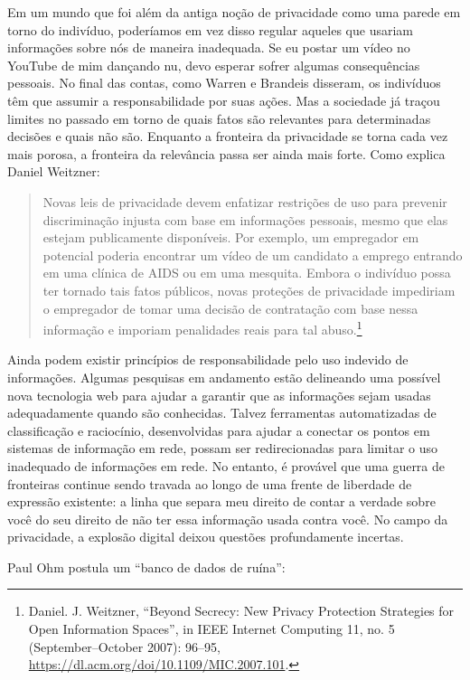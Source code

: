 \documentclass{book}
\begin{document}
Em um mundo que foi além da antiga noção de privacidade como uma parede em torno
do indivíduo, poderíamos em vez disso regular aqueles que usariam informações
sobre nós de maneira inadequada. Se eu postar um vídeo no YouTube de mim dançando
nu, devo esperar sofrer algumas consequências pessoais. No final das contas, como
Warren e Brandeis disseram, os indivíduos têm que assumir a responsabilidade por
suas ações. Mas a sociedade já traçou limites no passado em torno de quais fatos
são relevantes para determinadas decisões e quais não são. Enquanto a fronteira
da privacidade se torna cada vez mais porosa, a fronteira da relevância passa
ser ainda mais forte. Como explica Daniel Weitzner:

\begin{quote}
Novas leis de privacidade devem enfatizar restrições de uso para prevenir
discriminação injusta com base em informações pessoais, mesmo que elas estejam
publicamente disponíveis. Por exemplo, um empregador em potencial poderia
encontrar um vídeo de um candidato a emprego entrando em uma clínica de AIDS ou
em uma mesquita. Embora o indivíduo possa ter tornado tais fatos públicos, novas
proteções de privacidade impediriam o empregador de tomar uma decisão de
contratação com base nessa informação e imporiam penalidades reais para tal
abuso.\footnote{Daniel. J. Weitzner, ``Beyond Secrecy: New Privacy Protection
Strategies for Open Information Spaces'', in IEEE Internet Computing 11, no. 5
(September–October 2007): 96–95, 
\url{https://dl.acm.org/doi/10.1109/MIC.2007.101}.}
\end{quote}

Ainda podem existir princípios de responsabilidade pelo uso indevido de
informações. Algumas pesquisas em andamento estão delineando uma possível nova
tecnologia web para ajudar a garantir que as informações sejam usadas
adequadamente quando são conhecidas. Talvez ferramentas automatizadas de
classificação e raciocínio, desenvolvidas para ajudar a conectar os pontos em
sistemas de informação em rede, possam ser redirecionadas para limitar o uso
inadequado de informações em rede. No entanto, é provável que uma guerra de
fronteiras continue sendo travada ao longo de uma frente de liberdade de
expressão existente: a linha que separa meu direito de contar a verdade sobre
você do seu direito de não ter essa informação usada contra você. No campo da
privacidade, a explosão digital deixou questões profundamente incertas.

Paul Ohm postula um ``banco de dados de ruína'':
\end{document}
